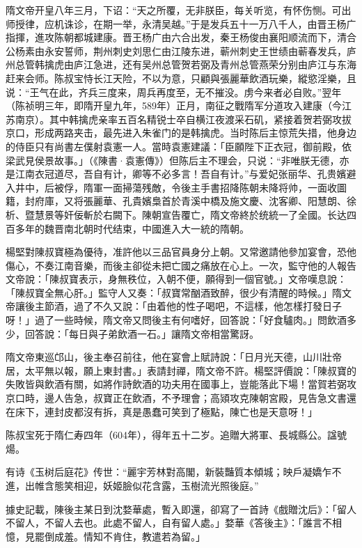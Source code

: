 隋文帝开皇八年三月，下诏：“天之所覆，无非朕臣，每关听览，有怀伤恻。可出师授律，应机诛诊，在期一举，永清吴越。”于是发兵五十一万八千人，由晋王杨广指揮，進攻陈朝都城建康。晋王杨广由六合出发，秦王杨俊由襄阳顺流而下，清合公杨素由永安誓师，荆州刺史刘思仁由江陵东进，蕲州刺史王世绩由蕲春发兵，庐州总管韩擒虎由庐江急进，还有吴州总管贺若弼及青州总管燕荣分别由庐江与东海赶来会师。陈叔宝恃长江天险，不以为意，只顧與張麗華飲酒玩樂，縱慾淫樂，且说：“王气在此，齐兵三度来，周兵再度至，无不摧没。虏今来者必自败。”翌年（陈祯明三年，即隋开皇九年，589年）正月，南征之戰隋军分道攻入建康（今江苏南京）。其中韩擒虎亲率五百名精锐士卒自横江夜渡采石矶，紧接着贺若弼攻拔京口，形成两路夹击，最先进入朱雀门的是韩擒虎。当时陈后主惊荒失措，他身边的侍臣只有尚書左僕射袁憲一人。當時袁憲建議：「臣願陛下正衣冠，御前殿，依梁武見侯景故事。」（《陳書·袁憲傳》）但陈后主不理会，只说：“非唯朕无德，亦是江南衣冠道尽，吾自有计，卿等不必多言！吾自有计。”与爱妃张丽华、孔贵嬪避入井中，后被俘，隋軍一面掃蕩残敵，令後主手書招降陈朝未降将帅，一面收圖籍，封府庫，又将張麗華、孔貴嬪梟首於青溪中橋及施文慶、沈客卿、阳慧朗、徐析、暨慧景等奸佞斬於右闕下。陳朝宣告覆亡，隋文帝終於统統一了全國。长达四百多年的魏晋南北朝时代结束，中國進入大一統的隋朝。

楊堅對陳叔寶極為優待，准許他以三品官員身分上朝。又常邀請他參加宴會，恐他傷心，不奏江南音樂，而後主卻從未把亡國之痛放在心上。一次，監守他的人報告文帝說：「陳叔寶表示，身無秩位，入朝不便，願得到一個官號。」文帝嘆息說：「陳叔寶全無心肝。」監守人又奏：「叔寶常酗酒致醉，很少有清醒的時候。」隋文帝讓後主節酒，過了不久又說：「由着他的性子喝吧，不這樣，他怎樣打發日子呀！」過了一些時候，隋文帝又問後主有何嗜好，回答說：「好食驢肉。」問飲酒多少，回答說：「每日與子弟飲酒一石。」讓隋文帝相當驚訝。

隋文帝東巡邙山，後主奉召前往，他在宴會上賦詩說：「日月光天德，山川壯帝居，太平無以報，願上東封書。」表請封禪，隋文帝不許。楊堅評價說：「陳叔寶的失敗皆與飲酒有關，如將作詩飲酒的功夫用在國事上，豈能落此下場！當賀若弼攻京口時，邊人告急，叔寶正在飲酒，不予理會；高熲攻克陳朝宮殿，見告急文書還在床下，連封皮都沒有拆，真是愚蠢可笑到了極點，陳亡也是天意呀！」

陈叔宝死于隋仁寿四年（604年），得年五十二岁。追贈大將軍、長城縣公。諡號煬。

有诗《玉树后庭花》传世：“麗宇芳林對高閣，新裝豔質本傾城；映戶凝嬌乍不進，出帷含態笑相迎，妖姬臉似花含露，玉樹流光照後庭。”

據史記載，陳後主某日到沈婺華處，暫入即還，卻寫了一首詩《戲贈沈后》：「留人不留人，不留人去也。此處不留人，自有留人處。」婺華《答後主》：「誰言不相憶，見罷倒成羞。情知不肯住，教遣若為留。」

